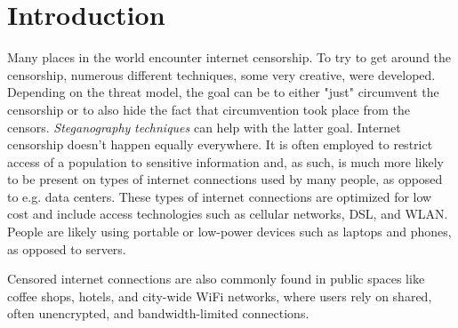 
\chapter{Introduction}


Many places in the world encounter internet censorship.
To try to get around the censorship, numerous different techniques, some very creative, were developed.
Depending on the threat model, the goal can be to either "just" circumvent the censorship or to also hide the fact that circumvention took place from the censors.
\textit{Steganography} \cite{wiki:Steganography} \textit{techniques} \cite{wiki:List_of_steganography_techniques} can help with the latter goal.
Internet censorship doesn't happen equally everywhere.
It is often employed to restrict access of a population to sensitive information and, as such, is much more likely to be present on types of internet connections used by many people, as opposed to e.g. data centers.
These types of internet connections are optimized for low cost and include access technologies such as cellular networks, DSL, and WLAN.
People are likely using portable or low-power devices such as laptops and phones, as opposed to servers.

Censored internet connections are also commonly found in public spaces like coffee shops, hotels, and city-wide WiFi networks, where users rely on shared, often unencrypted, and bandwidth-limited connections.


